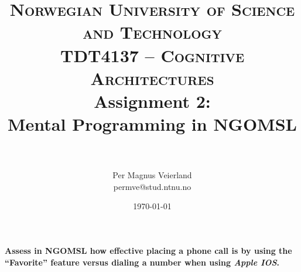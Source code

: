 

\usepackage{tcolorbox}

\title{	
\normalfont \normalsize 
\textsc{Norwegian University of Science and Technology\\TDT4137 -- Cognitive Architectures}
\horrule{0.5pt} \\[0.4cm]
\huge Assignment 2:\\ Mental Programming in NGOMSL\\
\horrule{2pt} \\[0.5cm]
}

\author{Per Magnus Veierland\\permve@stud.ntnu.no}

\date{\normalsize\today}




\maketitle

\textbf{Assess in \ac{NGOMSL} how effective placing a phone call is by using the ``Favorite'' feature versus dialing a number when using \textit{Apple IOS}.}

